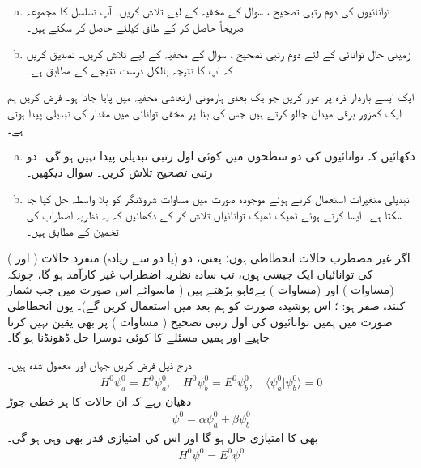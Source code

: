 \begin{enumerate}[a.]
\item
توانائیوں کی  دوم رتبی  تصحیح  ،  سوال     کے  مخفیہ کے لیے تلاش کریں۔   آپ تسلسل کا مجموعہ صریحاً حاصل کر کے طاق  کیلئے   حاصل کر سکتے ہیں۔
\item
زمینی حال توانائی کے لئے دوم رتبی تصحیح  ،  سوال    کے مخفیہ کے لیے تلاش کریں۔ تصدیق کریں  کہ آپ کا نتیجہ بالکل درست نتیجے کے مطابق ہے۔ 
\end{enumerate}
ایک ایسے  باردار  ذرہ پر غور کریں جو یک بعدی ہارمونی ارتعاشی مخفیہ  میں پایا جاتا ہو۔ فرض کریں  ہم ایک کمزور برقی میدان  چالو کرتے ہیں جس کی بنا پر مخفی توانائی میں  مقدار کی تبدیلی پیدا ہوتی ہے۔
\begin{enumerate}[a.]
\item
دکھائیں کہ توانائیوں کی  دو سطحوں میں کوئی اول رتبی تبدیلی پیدا نہیں ہو گی۔ دو رتبی تصحیح  تلاش کریں۔  سوال    دیکھیں۔
\item
تبدیلی متغیرات  استعمال کرتے ہوئے موجودہ صورت میں مساوات  شروڈنگر  کو بلا واسطہ حل کیا جا سکتا ہے۔ ایسا کرتے ہوئے ٹھیک ٹھیک توانائیاں تلاش کر کے دکھائیں کہ یہ نظریہ اضطراب کی تخمین کے مطابق ہیں۔
\end{enumerate}




اگر غیر مضطرب حالات انحطاطی ہوں؛  یعنی،  دو (یا دو سے زیادہ)  منفرد حالات (  اور )  کی توانائیاں ایک  جیسی ہوں،  تب سادہ نظریہ اضطراب غیر کارآمد ہو گا،  چونکہ  (مساوات  )   اور  (مساوات )  بےقابو بڑھتے ہیں  ( ماسوائے اس صورت میں  جب شمار کنندہ صفر ہو:  ؛  اس  پوشیدہ   صورت   کو ہم بعد میں استعمال کریں گے)۔ یوں  انحطاطی صورت میں ہمیں توانائیوں کی اول  رتبی تصحیح ( مساوات )   پر بھی یقین نہیں کرنا چاہیے اور ہمیں مسئلے کا کوئی دوسرا حل ڈھونڈنا   ہو گا۔


درج ذیل فرض کریں جہاں  اور  معمول شدہ ہیں۔
\begin{align}\label{مساوات_غیر_مضطرب_دو_پڑتا_اضطراب}
H^0 \psi_a^0 = E^0 \psi_a^0, \quad H^0 \psi_b^0 = E^0 \psi_b^0, \quad \langle \psi_a^0 | \psi_b^0 \rangle = 0
\end{align}
دھیان رہے کہ ان حالات کا ہر خطی جوڑ 
\begin{align}\label{مساوات_غیر_مضطرب_دو_پڑتا_عمومی}
\psi^0 = \alpha \psi_a^0 + \beta \psi_b^0
\end{align}
بھی  کا امتیازی حال ہو گا اور اس  کی  امتیازی قدر  بھی وہی ہو گی۔ 
\begin{align}\label{مساوات_غیر_مضطرب_دو_پڑتا_وہی_توانائی}
H^0 \psi^0 = E^0 \psi^0
\end{align}

